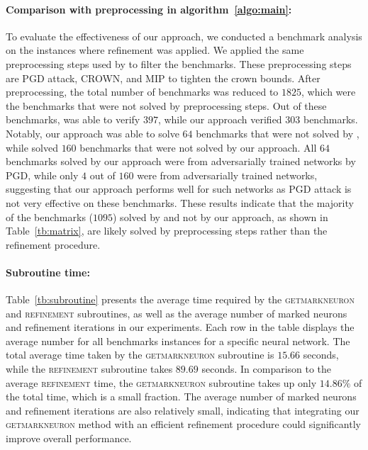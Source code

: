 \paragraph{Comparison with preprocessing in algorithm~\ref{algo:main}: } 
To evaluate the effectiveness of our approach, we conducted a benchmark analysis on the instances where 
refinement was applied. We applied the same preprocessing steps used by \alphabeta{} to filter the benchmarks.
These preprocessing steps are PGD attack, CROWN, and MIP to tighten the crown bounds. 
After preprocessing, the total number of benchmarks was reduced to $1825$, which were the benchmarks that were not 
solved by preprocessing steps. Out of these benchmarks, \alphabeta{} was able to verify $397$, 
while our approach verified 
$303$ benchmarks. Notably, our approach was able to solve $64$ benchmarks that were not solved by \alphabeta{}, 
while \alphabeta{} solved $160$ benchmarks that were not solved by our approach. 
All $64$ benchmarks solved by our approach were from adversarially trained networks by PGD, 
while only $4$ out of $160$ were from adversarially trained networks, suggesting that our approach performs 
well for such networks as PGD attack is not very effective on these benchmarks. 
These results indicate that the majority of the benchmarks ($1095$) solved by \alphabeta{} and not by our approach, 
as shown in Table~\ref{tb:matrix}, are likely solved by preprocessing steps rather than the refinement procedure.


\paragraph{Subroutine time: }
Table~\ref{tb:subroutine} presents the average time required by the \textsc{getmarkneuron} and \textsc{refinement} 
subroutines, as well as the average number of marked neurons and refinement iterations in our experiments. 
Each row in the table displays the average number for all benchmarks instances for a specific neural network. 
The total average time taken by the \textsc{getmarkneuron} subroutine is $15.66$ seconds, while the \textsc{refinement}
subroutine takes $89.69$ seconds. In comparison to the average \textsc{refinement} time, the \textsc{getmarkneuron} 
subroutine takes up only $14.86\%$ of the total time, which is a small fraction. 
The average number of marked neurons and refinement iterations are also relatively small, 
indicating that integrating our \textsc{getmarkneuron} method with an efficient refinement procedure could significantly 
improve overall performance. 

